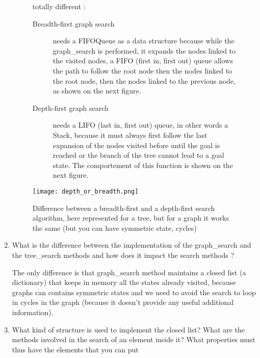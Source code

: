 \begin{enumerate}
\begin{figure}[!ht]
\begin{framed}
            totally different :
            \begin{description}
                \item[Breadth-first graph search] needs a FIFOQueue as a
                    data structure because while the graph\_search is
                    performed, it expands the nodes linked to the visited
                    nodes, a FIFO (first in, first out) queue allows the
                    path to follow the root node then the nodes linked to
                    the root node, then the nodes linked to the previous
                    node, as shown on the next figure.
                \item[Depth-first graph search] needs a LIFO (last in,
                    first out) queue, in other words a Stack, because it
                    must always first follow the last expansion of the
                    nodes visited before until the goal is reached or the
                    branch of the tree cannot lead to a goal state. The
                    comportement of this function is shown on the next
                    figure.
            \end{description}
                \centering
                \texttt{[image: depth\_or\_breadth.png]}
                \caption{Difference between a breadth-first and a depth-first
                search algorithm, here represented for a tree, but for a
                graph it works the same (but you can have symmetric state,
                cycles)}
        \end{framed}
        \end{figure}
        \FloatBarrier
    \item What is the difference between the implementation of the
        graph\_search and the tree\_search methods and how does it impact
        the search methods ?
        \begin{framed}
            The only difference is that graph\_search method maintains a
            closed list (a dictionary) that keeps in memory all the states
            already visited, because graphs can contains symmetric states
            and we need to avoid the search to loop in cycles in the graph
            (because it doesn't provide any useful additional information).
        \end{framed}
    \item What kind of structure is used to implement the closed list?
        What are the methods involved in the search of an element inside
        it? What properties must thus have the elements that you can put

\end{enumerate}
